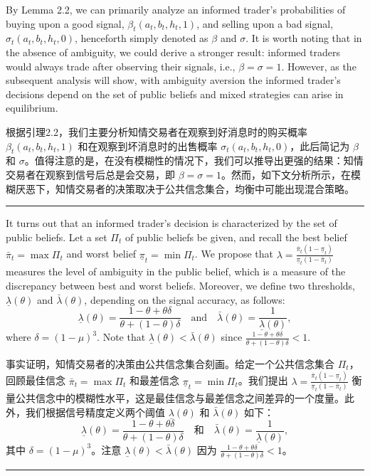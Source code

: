 \documentclass[12pt,a4paper]{article}
\newenvironment{original}{%
  \par\vspace{4pt}\noindent%
  \color{black}%
  \ignorespaces
}{%
  \par\vspace{2pt}%
}
\newenvironment{translation}{%
  \par\vspace{2pt}\noindent%
  \color{transblue}%
  \ignorespaces
}{%
  \par\vspace{4pt}\hrule\vspace{6pt}%
}
\begin{document}
\begin{original}
By Lemma 2.2, we can primarily analyze an informed trader's probabilities of buying upon a good signal, $\beta_t(a_t, b_t, h_t, 1)$, and selling upon a bad signal, $\sigma_t(a_t, b_t, h_t, 0)$, henceforth simply denoted as $\beta$ and $\sigma$. It is worth noting that in the absence of ambiguity, we could derive a stronger result: informed traders would always trade after observing their signals, i.e., $\beta = \sigma = 1$. However, as the subsequent analysis will show, with ambiguity aversion the informed trader's decisions depend on the set of public beliefs and mixed strategies can arise in equilibrium.
\end{original}
\begin{translation}
根据引理2.2，我们主要分析知情交易者在观察到好消息时的购买概率 $\beta_t(a_t, b_t, h_t, 1)$ 和在观察到坏消息时的出售概率 $\sigma_t(a_t, b_t, h_t, 0)$，此后简记为 $\beta$ 和 $\sigma$。值得注意的是，在没有模糊性的情况下，我们可以推导出更强的结果：知情交易者在观察到信号后总是会交易，即 $\beta = \sigma = 1$。然而，如下文分析所示，在模糊厌恶下，知情交易者的决策取决于公共信念集合，均衡中可能出现混合策略。
\end{translation}

\begin{original}
It turns out that an informed trader's decision is characterized by the set of public beliefs. Let a set $\Pi_t$ of public beliefs be given, and recall the best belief $\bar{\pi}_t = \max \Pi_t$ and worst belief $\underline{\pi}_t = \min \Pi_t$. We propose that $\lambda = \frac{\bar{\pi}_t(1-\underline{\pi}_t)}{\underline{\pi}_t(1-\bar{\pi}_t)}$ measures the level of ambiguity in the public belief, which is a measure of the discrepancy between best and worst beliefs. Moreover, we define two thresholds, $\underline{\lambda}(\theta)$ and $\bar{\lambda}(\theta)$, depending on the signal accuracy, as follows:
\[
\underline{\lambda}(\theta) = \frac{1-\theta+\theta\delta}{\theta+(1-\theta)\delta} \quad \text{and} \quad \bar{\lambda}(\theta) = \frac{1}{\underline{\lambda}(\theta)},
\]
where $\delta = (1-\mu)^3$. Note that $\underline{\lambda}(\theta) < \bar{\lambda}(\theta)$ since $\frac{1-\theta+\theta\delta}{\theta+(1-\theta)\delta} < 1$.
\end{original}
\begin{translation}
事实证明，知情交易者的决策由公共信念集合刻画。给定一个公共信念集合 $\Pi_t$，回顾最佳信念 $\bar{\pi}_t = \max \Pi_t$ 和最差信念 $\underline{\pi}_t = \min \Pi_t$。我们提出 $\lambda = \frac{\bar{\pi}_t(1-\underline{\pi}_t)}{\underline{\pi}_t(1-\bar{\pi}_t)}$ 衡量公共信念中的模糊性水平，这是最佳信念与最差信念之间差异的一个度量。此外，我们根据信号精度定义两个阈值 $\underline{\lambda}(\theta)$ 和 $\bar{\lambda}(\theta)$ 如下：
\[
\underline{\lambda}(\theta) = \frac{1-\theta+\theta\delta}{\theta+(1-\theta)\delta} \quad \text{和} \quad \bar{\lambda}(\theta) = \frac{1}{\underline{\lambda}(\theta)},
\]
其中 $\delta = (1-\mu)^3$。注意 $\underline{\lambda}(\theta) < \bar{\lambda}(\theta)$ 因为 $\frac{1-\theta+\theta\delta}{\theta+(1-\theta)\delta} < 1$。
\end{translation}
\end{document}
